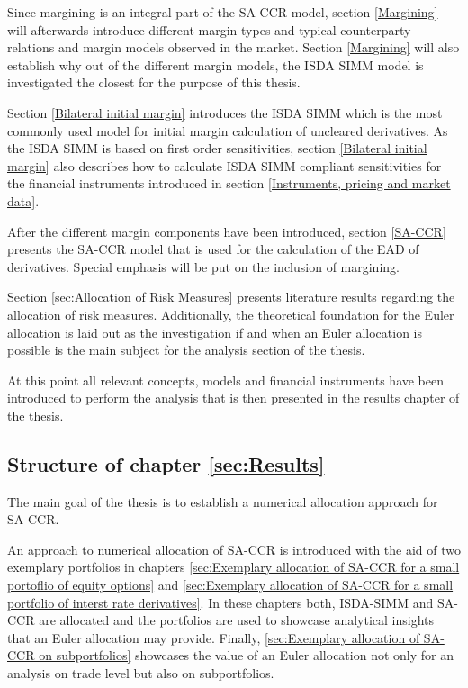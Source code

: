 \documentclass[../Thesis_AHoecherl.tex]{subfiles}
\begin{document}
    Since margining is an integral part of the \gls{SA-CCR} model, section \ref{Margining} will afterwards introduce different margin types and typical counterparty relations and margin models observed in the market. Section \ref{Margining} will also establish why out of the different margin models, the \gls{ISDA SIMM} model is investigated the closest for the purpose of this thesis.

    Section \ref{Bilateral initial margin} introduces the ISDA SIMM which is the most commonly used model for initial margin calculation of uncleared derivatives. As the ISDA SIMM is based on first order sensitivities, section \ref{Bilateral initial margin} also describes how to calculate \gls{ISDA SIMM} compliant sensitivities for the financial instruments introduced in section \ref{Instruments, pricing and market data}.

    After the different margin components have been introduced, section \ref{SA-CCR} presents the SA-CCR model that is used for the calculation of the \gls{EAD} of derivatives. Special emphasis will be put on the inclusion of margining.

    Section \ref{sec:Allocation of Risk Measures} presents literature results regarding the allocation of risk measures. Additionally, the theoretical foundation for the Euler allocation is laid out as the investigation if and when an Euler allocation is possible is the main subject for the analysis section of the thesis.

    At this point all relevant concepts, models and financial instruments have been introduced to perform the analysis that is then presented in the results chapter of the thesis. 
    
    \subsection{Structure of chapter \ref{sec:Results}}
    
    The main goal of the thesis is to establish a numerical allocation approach for SA-CCR.

    An approach to numerical allocation of SA-CCR is introduced with the aid of two exemplary portfolios in chapters \ref{sec:Exemplary allocation of SA-CCR for a small portoflio of equity options} and \ref{sec:Exemplary allocation of SA-CCR for a small portfolio of interst rate derivatives}. 
    In these chapters both, ISDA-SIMM and SA-CCR are allocated and the portfolios are used to showcase analytical insights that an Euler allocation may provide. Finally, \ref{sec:Exemplary allocation of SA-CCR on subportfolios} showcases the value of an Euler allocation not only for an analysis on trade level but also on subportfolios.
\end{document}
